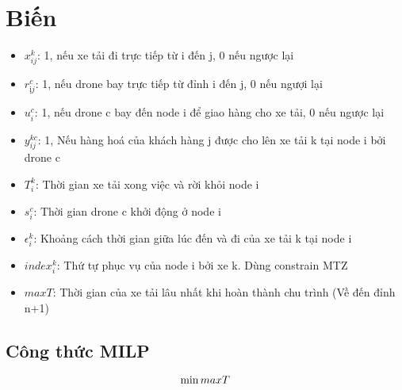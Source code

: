 \documentclass{article}
\begin{document}
\section{Biến}

\begin{itemize}
	\item $x_{ij}^{k}$: 1, nếu xe tải đi trực tiếp từ i đến j, 0 nếu ngược lại
	\item $r_{ịj}^{c}$: 1, nếu drone bay trực tiếp từ đỉnh i đến j, 0 nếu ngượi lại
	\item $u_{i}^{c}$: 1, nếu drone c bay đến node i để giao hàng cho xe tải, 0 nếu ngược lại
	\item $y_{ij}^{kc}$: 1, Nếu hàng hoá của khách hàng j được cho lên xe tải k tại node i bởi drone c
	\item $T_{i}^{k}$: Thời gian xe tải xong việc và rời khỏi node i
	\item $s_{i}^{c}$: Thời gian drone c khởi động ở node i
	\item $\epsilon_{i}^{k}$: Khoảng cách thời gian giữa lúc đến và đi của xe tải k tại node i
	\item $index_{i}^{k}$: Thứ tự phục vụ của node i bởi xe k. Dùng constrain MTZ
	\item $maxT$: Thời gian của xe tải lâu nhất khi hoàn thành chu trình (Về đến đỉnh n+1)

\end{itemize}

\subsection{Công thức MILP}


\begin{equation}
\centering
\min  maxT
\end{equation}
\end{document}

